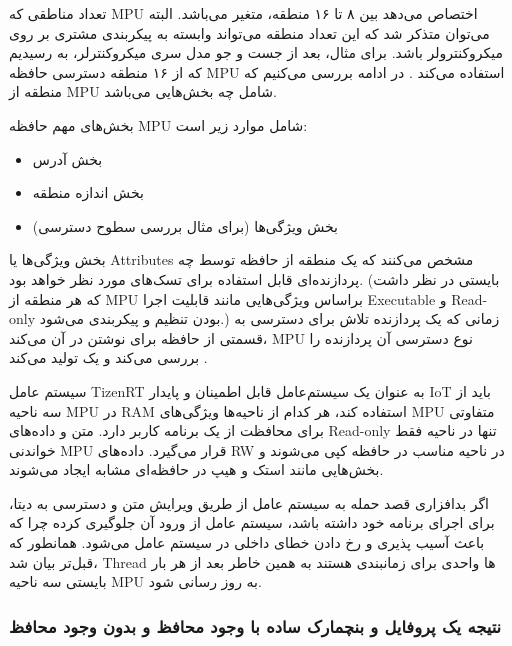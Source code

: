 \documentclass[10pt, a4paper]{article}
\begin{document}
تعداد مناطقی که MPU اختصاص می‌دهد بین ۸ تا ۱۶ منطقه، متغیر می‌باشد. البته
می‌توان متذکر شد که این تعداد منطقه می‌تواند وابسته به پیکربندی مشتری بر روی
میکروکنترولر باشد. برای مثال، بعد از جست و جو مدل سری میکروکنترلر، به  رسیدیم که از ۱۶ منطقه دسترسی حافظه MPU استفاده می‌کند
\cite{armnxpimxrt1020}. در ادامه بررسی می‌کنیم که منطقه از MPU شامل چه بخش‌هایی
می‌باشد.

بخش‌های مهم حافظه MPU شامل موارد زیر است:

\begin{itemize}
    \item بخش آدرس
    \item بخش اندازه منطقه
    \item بخش ویژگی‌ها (برای مثال بررسی سطوح دسترسی)
\end{itemize}

بخش ویژگی‌ها یا Attributes مشخص می‌کنند که یک منطقه از حافظه توسط چه پردازنده‌ای
قابل استفاده برای تسک‌های مورد نظر خواهد بود. (بایستی در نظر داشت که هر منطقه از
MPU براساس ویژگی‌هایی مانند قابلیت اجرا Executable و Read-only بودن تنظیم و
پیکربندی می‌شود.) زمانی که یک پردازنده تلاش برای دسترسی به قسمتی از حافظه برای
نوشتن در آن می‌کند، MPU نوع دسترسی آن پردازنده را بررسی می‌کند و یک
 تولید می‌کند \cite{armcortexm7} \cite{cortexm4arm}.

سیستم عامل TizenRT به عنوان یک سیستم‌عامل قابل اطمینان و پایدار IoT باید از سه
ناحیه MPU در RAM استفاده کند، هر کدام از ناحیه‌ها ویژگی‌های MPU متفاوتی برای
محافظت از یک برنامه کاربر دارد. متن و داده‌های Read-only تنها در ناحیه فقط
خواندنی MPU قرار می‌گیرد. داده‌های RW در ناحیه مناسب در حافظه کپی می‌شوند و
بخش‌هایی مانند استک و هیپ در حافظه‌ای مشابه ایجاد می‌شوند.

اگر بد‌افزاری قصد حمله به سیستم عامل از طریق ویرایش متن و دسترسی به دیتا، برای
اجرای برنامه خود داشته باشد، سیستم عامل از ورود آن جلوگیری کرده چرا که باعث آسیب
پذیری و رخ دادن خطای داخلی در سیستم عامل  می‌شود.  همانطور که قبل‌تر بیان شد،
Thread ها واحدی برای زمانبندی هستند به همین خاطر بعد از هر بار  بایستی سه ناحیه MPU به روز رسانی شود.

\subsubsection{نتیجه یک پروفایل و بنچمارک ساده با وجود محافظ و بدون وجود محافظ}
\end{document}
